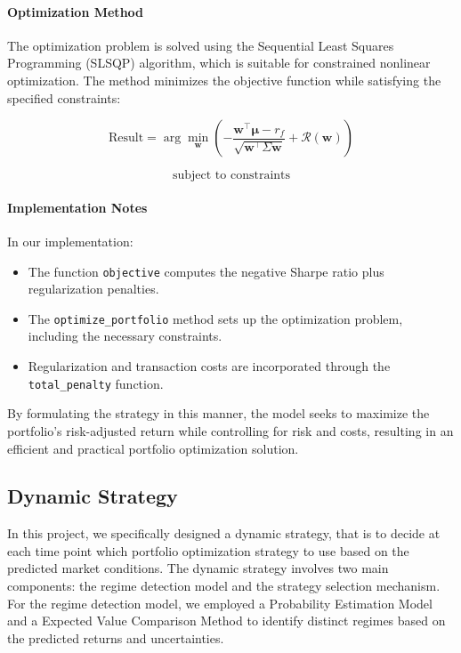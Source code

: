 \paragraph{Optimization Method}

The optimization problem is solved using the Sequential Least Squares Programming (SLSQP) algorithm, which is suitable for constrained nonlinear optimization. The method minimizes the objective function while satisfying the specified constraints:

\[
\text{Result} = \arg\min_{\mathbf{w}} \left( -\dfrac{\mathbf{w}^\top \boldsymbol{\mu} - r_f}{\sqrt{\mathbf{w}^\top \Sigma \mathbf{w}}} + \mathcal{R}(\mathbf{w}) \right)
\]

\[
\text{subject to constraints}
\]

\paragraph{Implementation Notes}

In our implementation:

\begin{itemize}
    \item The function \texttt{objective} computes the negative Sharpe ratio plus regularization penalties.
    \item The \texttt{optimize\_portfolio} method sets up the optimization problem, including the necessary constraints.
    \item Regularization and transaction costs are incorporated through the \texttt{total\_penalty} function.
\end{itemize}

By formulating the strategy in this manner, the model seeks to maximize the portfolio's risk-adjusted return while controlling for risk and costs, resulting in an efficient and practical portfolio optimization solution.


\subsection{Dynamic Strategy}
In this project, we specifically designed a dynamic strategy, that is to decide at each time point which portfolio optimization strategy to use based on the predicted market conditions. The dynamic strategy involves two main components: the regime detection model and the strategy selection mechanism.
For the regime detection model, we employed a Probability Estimation Model and a Expected Value Comparison Method to identify distinct regimes based on the predicted returns and uncertainties. 

